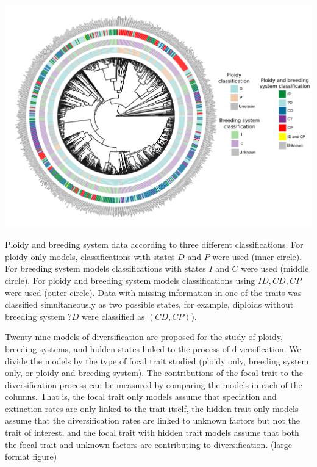 \begin{suppfigure}
\includegraphics[width=\textwidth]{figS1.pdf}
    \caption{Ploidy and breeding system data according to three different classifications. For ploidy only models, classifications with states $D$ and $P$ were used (inner circle). For breeding system models classifications with states $I$ and $C$ were used (middle circle). For ploidy and breeding system models classifications using $ID, CD, CP$ were used (outer circle). Data with missing information in one of the traits was classified simultaneously as two possible states, for example, diploids without breeding system $?D$ were classified as $(CD, CP)$).}
    \label{fig:allmodels}
\end{suppfigure}



\begin{suppfigure} %
    \caption{ Twenty-nine models of diversification are proposed for the study of ploidy, breeding systems, and hidden states linked to the process of diversification. We divide the models by the type of focal trait studied (ploidy only, breeding system only, or ploidy and breeding system). The contributions of the focal trait to the diversification process can be measured by comparing the models in each of the columns. That is, the focal trait only models assume that speciation and extinction rates are only linked to the trait itself, the hidden trait only models assume that the diversification rates are  linked to unknown factors but not the trait of interest, and the focal trait with hidden trait models assume that both the focal trait and unknown factors are contributing to diversification. (large format figure)}
    \label{fig:allmodels}
\end{suppfigure}



